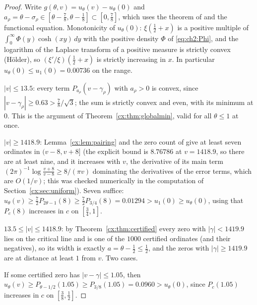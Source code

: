 \begin{proof}
Write $g(\theta,v)=u_\theta(v)-u_\theta(0)$ and $a_\rho=\theta-\sigma_\rho\in[\theta-\tfrac78,\theta-\tfrac18]\subset[0,\tfrac78]$, which uses the theorem of \cite{OAI26a} and the functional equation. Monotonicity of $u_\theta(0)$: $\xi(\tfrac12+x)$ is a positive multiple of $\int_0^\infty\Phi(y)\cosh(xy)\,dy$ with the positive density $\Phi$ of \eqref{eq:ch2:Phi}, and the logarithm of the Laplace transform of a positive measure is strictly convex (H\"older), so $(\xi'/\xi)(\tfrac12+x)$ is strictly increasing in $x$. In particular $u_\theta(0)\le u_1(0)=0.00736$ on the range.

$|v|\le13.5$: every term $P_{a_\rho}(v-\gamma_\rho)$ with $a_\rho>0$ is convex, since $|v-\gamma_\rho|\ge0.63>\tfrac78/\sqrt3$; the sum is strictly convex and even, with its minimum at $0$. This is the argument of Theorem~\ref{cx:thm:globalmin}, valid for all $\theta\le1$ at once.

$|v|\ge1418.9$: Lemma~\ref{cx:lem:pairing} and the zero count of \cite{HSW22} give at least seven ordinates in $(v-8,v+8]$ (the explicit bound is $8.76786$ at $v=1418.9$, so there are at least nine, and it increases with $v$, the derivative of its main term $(2\pi)^{-1}\log\frac{v+8}{v-8}\ge8/(\pi v)$ dominating the derivatives of the error terms, which are $O(1/v)$; this was checked numerically in the computation of Section~\ref{cx:sec:uniform}). Seven suffice: $u_\theta(v)\ge\tfrac72P_{2\theta-1}(8)\ge\tfrac72P_{3/4}(8)=0.01294>u_1(0)\ge u_\theta(0)$, using that $P_c(8)$ increases in $c$ on $[\tfrac34,1]$.

$13.5\le|v|\le1418.9$: by Theorem~\ref{cx:thm:certified} every zero with $|\gamma|<1419.9$ lies on the critical line and is one of the $1000$ certified ordinates (and their negatives), so its width is exactly $a=\theta-\tfrac12\le\tfrac12$, and the zeros with $|\gamma|\ge1419.9$ are at distance at least $1$ from $v$. Two cases.

If some certified zero has $|v-\gamma|\le1.05$, then $u_\theta(v)\ge P_{\theta-1/2}(1.05)\ge P_{3/8}(1.05)=0.0960>u_\theta(0)$, since $P_c(1.05)$ increases in $c$ on $[\tfrac38,\tfrac12]$.


\end{proof}
